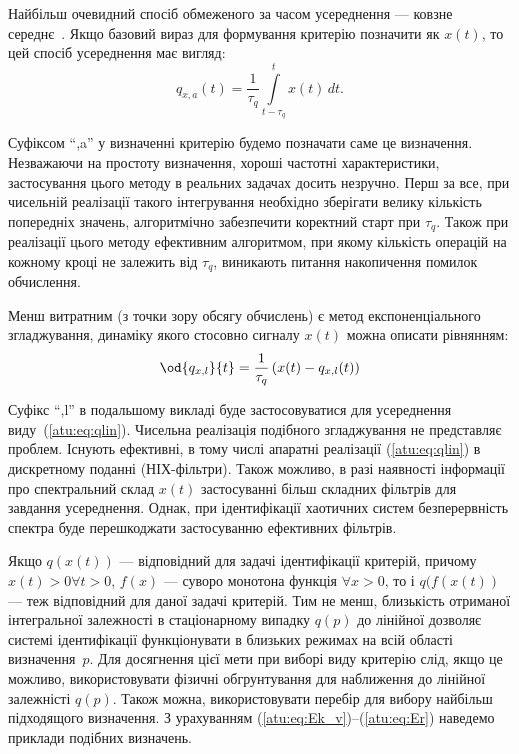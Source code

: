Найбільш очевидний спосіб обмеженого за часом усереднення ---
ковзне середнє~\cite{greshilov_mat_met_prognoz}.
Якщо базовий вираз для формування критерію позначити як
$x(t)$, то цей спосіб усереднення має вигляд:
%
\begin{equation}
  q_{x,a}(t) =
  \frac{1}{\tau_q}
  \int\limits_{t-\tau_q}^{t} x(t) \, dt.
  \label{atu:eq:moving_avarage}
\end{equation}

Суфіксом ``,a'' у визначенні критерію будемо позначати саме це
визначення. Незважаючи на простоту визначення, хороші частотні
характеристики, застосування цього методу в реальних задачах
досить незручно. Перш за все, при чисельній реалізації такого
інтегрування необхідно зберігати велику кількість попередніх
значень, алгоритмічно забезпечити коректний старт при
$ \tau_q $. Також при реалізації цього методу ефективним алгоритмом,
при якому кількість операцій на кожному кроці не залежить від
$ \tau_q $, виникають питання накопичення помилок обчислення.

Менш витратним (з точки зору обсягу обчислень) є метод експоненціального
згладжування, динаміку якого стосовно сигналу $x(t)$ можна описати
рівнянням:
%
\begin{equation}
\od{q_{x,l}}{t}
=
\frac{1}{\tau_q} \left( x(t) - q_{x,l}(t) \right)
\label{atu:eq:qlin}
\end{equation}

Суфікс ``,l'' в подальшому викладі буде застосовуватися для
усереднення виду~(\ref{atu:eq:qlin}). Чисельна реалізація подібного
згладжування не представляє проблем. Існують ефективні, в тому
числі апаратні реалізації (\ref{atu:eq:qlin}) в дискретному поданні
(НІХ-фільтри). Також можливо, в разі наявності інформації про
спектральний склад
$x(t)$ застосуванні більш складних фільтрів для завдання
усереднення. Однак, при ідентифікації хаотичних систем
безперервність спектра буде перешкоджати застосуванню
ефективних фільтрів.


Якщо
$q(x(t))$ --- відповідний для задачі ідентифікації критерій,
причому
$ x (t)> 0 \forall t> 0 $,
$ f (x) $ --- суворо монотона функція
$ \forall x > 0 $, то і
$q(f(x(t))$ --- теж відповідний для даної задачі критерій. Тим
не менш, близькість отриманої інтегральної залежності в
стаціонарному випадку
$q(p)$ до лінійної дозволяє системі ідентифікації функціонувати
в близьких режимах на всій області визначення~$p$.
Для досягнення цієї мети при виборі виду критерію слід, якщо
це можливо, використовувати фізичні обгрунтування для наближення
до лінійної залежністі $q(p)$.
Також можна, використовувати перебір для вибору найбільш
підходящого визначення. З урахуванням (\ref{atu:eq:Ek_v})--(\ref{atu:eq:Er})
наведемо приклади подібних визначень.


